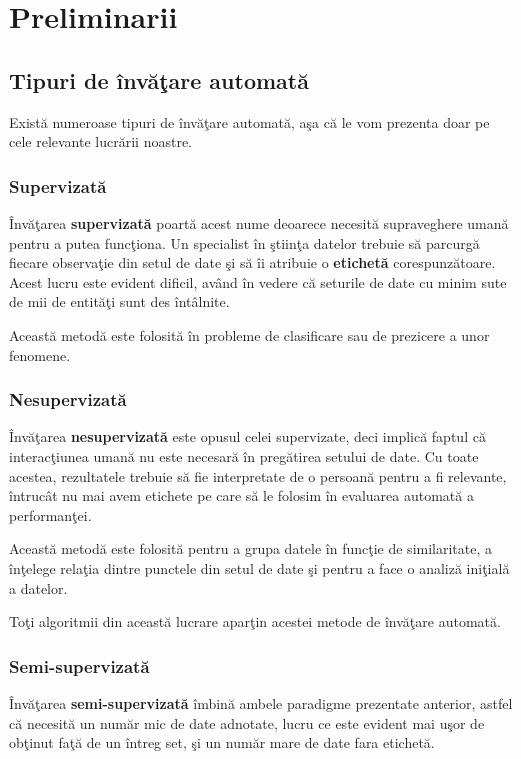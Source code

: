 \chapter{Preliminarii}

\section{Tipuri de învăţare automată}

Există numeroase tipuri de învăţare automată, aşa că le vom prezenta doar 
pe cele relevante lucrării noastre.

\subsection{Supervizată}

Învăţarea \textbf{supervizată} poartă acest nume deoarece necesită supraveghere 
umană pentru a putea funcţiona. Un specialist în ştiinţa datelor trebuie 
să parcurgă fiecare observaţie din setul de date şi să îi atribuie 
o \textbf{etichetă} corespunzătoare. Acest lucru este evident dificil, având în 
vedere că seturile de date cu minim sute de mii de entităţi sunt des întâlnite.

Această metodă este folosită în probleme de clasificare sau de prezicere 
a unor fenomene.

\subsection{Nesupervizată}

Învăţarea \textbf{nesupervizată} este opusul celei supervizate, deci implică faptul 
că interacţiunea umană nu este necesară în pregătirea setului de date. Cu toate 
acestea, rezultatele trebuie să fie interpretate de o persoană pentru a fi relevante,
întrucât nu mai avem etichete pe care să le folosim în evaluarea automată a 
performanţei.

Această metodă este folosită pentru a grupa datele în funcţie de similaritate,
a înţelege relaţia dintre punctele din setul de date şi pentru a face o analiză 
iniţială a datelor.

Toţi algoritmii din această lucrare aparţin acestei metode de învăţare automată.

\subsection{Semi-supervizată}

Învăţarea  \textbf{semi-supervizată} 
îmbină ambele paradigme prezentate anterior, astfel
că necesită un număr mic de date adnotate, lucru ce este evident mai uşor de 
obţinut faţă de un întreg set, şi un număr mare de date fara etichetă.

